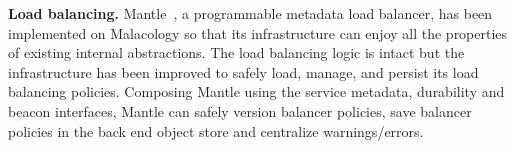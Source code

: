 \documentclass[preprint]{sigplanconf-eurosys}
\begin{document}
{\bf Load balancing.} Mantle~\cite{sevilla:sc15-mantle}, a programmable
metadata load balancer, has been implemented on Malacology so that its
infrastructure can enjoy all the properties of existing internal abstractions.
The load balancing logic is intact but the infrastructure has been improved to
safely load, manage, and persist its load balancing policies.  Composing Mantle
using the service metadata, durability and beacon interfaces, Mantle can safely
version balancer policies, save balancer policies in the back end object store
and centralize warnings/errors.


%
\end{document}
